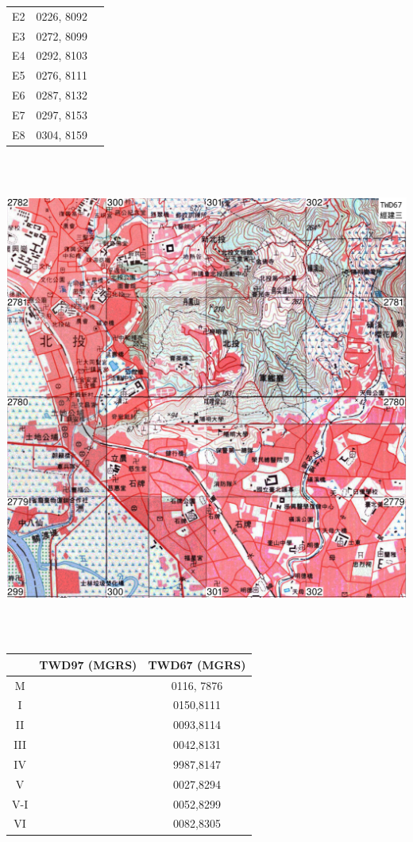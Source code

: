 \documentclass[12pt,landscape]{article}
\begin{document}
\begin{multicols}{2}
\begin{tabular}{|c|c|c|}
	E2 & 0226, 8092 & \\
	E3 & 0272, 8099 & \\
	E4 & 0292, 8103 & \\
	E5 & 0276, 8111 & \\
	E6 & 0287, 8132 & \\
	E7 & 0297, 8153 & \\
	E8 & 0304, 8159 & \\
	\hline
\end{tabular}
\newpage
\includegraphics[width=16cm, height=16cm]{v3.png}
\begin{tabular}{|c|c|c|}
	\hline
	& TWD97 (MGRS) & TWD67 (MGRS)\\  
	\hline
	M & & 0116, 7876\\ 
	\hline
	I & & 0150,8111\\
	II & & 0093,8114\\
	III & & 0042,8131\\
	IV & & 9987,8147\\
	V & & 0027,8294\\
	V-I & & 0052,8299\\
	VI & & 0082,8305\\

\end{tabular}
\end{multicols}
\end{document}
